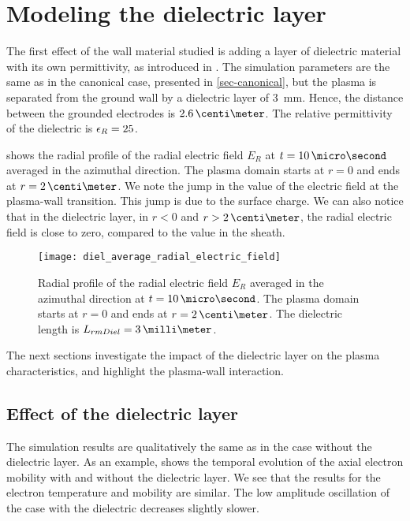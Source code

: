 
\section{Modeling the dielectric layer }
  \label{sec-diel_layer}
  
  The first effect of the wall material studied is adding a layer of dielectric material with its own permittivity, as introduced in .
  The simulation parameters are the same as in the canonical case, presented in \cref{sec-canonical}, but the plasma is separated from the ground wall by a dielectric layer of 3~mm.
  Hence, the distance between the grounded electrodes is $2.6\,\centi\meter$.
  The relative permittivity of the dielectric is $\epsilon_{R}=25$.
  
   shows the radial profile of the radial electric field $E_R$ at $t=10\,\micro\second$ averaged in the azimuthal direction.
  The plasma domain starts at $r=0$ and ends at $r=2\,\centi\meter$.
  We note the jump in the value of the electric field at the plasma-wall transition.
  This jump is due to the surface charge.
  We can also notice that in the dielectric layer, in $r < 0$ and $r > 2\,\centi\meter$, the radial electric field is close to zero, compared to the value in the sheath.
  
  \begin{figure}[hbt]
    \centering
    \texttt{[image: diel\_average\_radial\_electric\_field]}
    \caption{Radial profile of the radial electric field $E_R$ averaged in the azimuthal direction at $t=10\,\micro\second$. The plasma domain starts at $r=0$ and ends at $r=2\,\centi\meter$. The dielectric length is $L_{\\rm Diel} = 3\,\milli\meter$.  }
    \label{fig-diel_radial_Er}
  \end{figure}
  
  The next sections investigate the impact of the dielectric layer on the plasma characteristics, and highlight the plasma-wall interaction.
  
  \subsection{Effect of the dielectric layer} \label{subsec-effect_mob}
    
  
  The simulation results are qualitatively the same as in the case without the dielectric layer.
  As an example,  shows the temporal evolution of the axial electron mobility with and without the dielectric layer.
  We see that the results for the electron temperature and mobility are similar.
  The low amplitude oscillation of the case with the dielectric decreases slightly slower.
  
